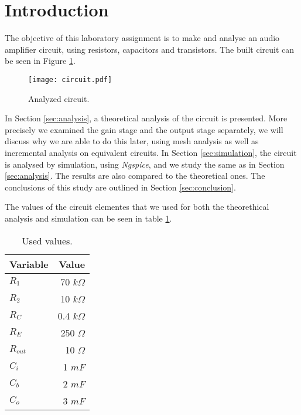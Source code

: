\section{Introduction}
\label{sec:introduction}

The objective of this laboratory assignment is to make and analyse an audio amplifier circuit, using resistors, capacitors and transistors. The built circuit can be seen in Figure \ref{fig:cir_intro}.

\begin{figure}[H] \centering
\texttt{[image: circuit.pdf]}
\caption{Analyzed circuit.}
\label{fig:cir_intro}
\end{figure}

In Section \ref{sec:analysis}, a theoretical analysis of the circuit is
presented. More precisely we examined the gain stage and the output stage separately, we will discuss why we are able to do this later, using mesh analysis as well as incremental analysis on equivalent circuits.
In Section \ref{sec:simulation}, the circuit is analysed by simulation, using \textit{Ngspice}, and we study the same as in Section \ref{sec:analysis}. The results are also compared to the theoretical ones. The conclusions of this study are outlined in Section \ref{sec:conclusion}.
\par
The values of the circuit elementes that we used for both the theorethical analysis and simulation can be seen in table \ref{tab:intro_values}.

\begin{table}[H]
  \centering
  \begin{tabular}{|l|r|}
    \hline
        {\bf Variable} & {\bf Value} \\ \hline
        $R_1$ & 70 $k\Omega$ \\ \hline
        $R_2$ & 10 $k\Omega$ \\ \hline
        $R_C$ & 0.4 $k\Omega$ \\ \hline
        $R_E$ & 250 $\Omega$ \\ \hline
        $R_{out}$ & 10 $\Omega$ \\ \hline
        $C_i$ & 1 $mF$ \\ \hline
        $C_b$ & 2 $mF$ \\ \hline
        $C_o$ & 3 $mF$ \\ \hline
  \end{tabular}
  \caption{Used values.}
  \label{tab:intro_values}
\end{table}
